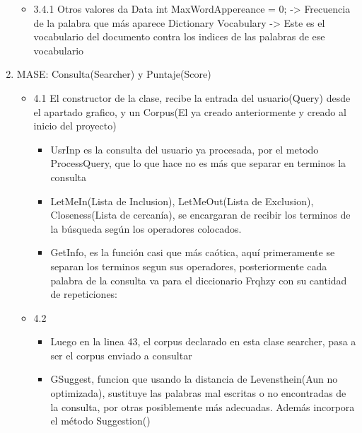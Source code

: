 \documentclass{article}
\begin{document}
\begin{enumerate}
\begin{itemize}
            \item \begin{figure}[h]
                  \end{figure}
            3.4.1 Otros valores da Data
            int MaxWordAppereance = 0; -> Frecuencia de la palabra que más aparece
            Dictionary Vocabulary -> Este es el vocabulario del documento contra los indices de las palabras de ese vocabulario
        \end{itemize}
    \newpage
    \item MASE: Consulta(Searcher) y Puntaje(Score)
        \begin{itemize}
            \item 4.1 El constructor de la clase, recibe la entrada del usuario(Query) desde el apartado grafico, y un Corpus(El ya creado anteriormente y creado al inicio del proyecto)
                \begin{itemize}
                    \item UsrInp es la consulta del usuario ya procesada, por el metodo ProcessQuery, que lo que hace no es más que separar en terminos la consulta
                    \item LetMeIn(Lista de Inclusion), LetMeOut(Lista de Exclusion), Closeness(Lista de cercanía), se encargaran de recibir los terminos de la búsqueda según los operadores colocados.
                    \item GetInfo, es la función casi que más caótica, aquí primeramente se separan los terminos segun sus operadores, posteriormente cada palabra de la consulta va para el diccionario Frqhzy con su cantidad de repeticiones:
                \end{itemize}
            \item 4.2
                \begin{itemize}
                    \item Luego en la linea 43, el corpus declarado en esta clase searcher, pasa a ser el corpus enviado a consultar
                    \item GSuggest, funcion que usando la distancia de Levensthein(Aun no optimizada), sustituye las palabras mal escritas o no encontradas de la consulta, por otras posiblemente más adecuadas. Además incorpora el método Suggestion() 
                    
                \end{itemize}
                

\end{itemize}
\end{enumerate}
\end{document}

